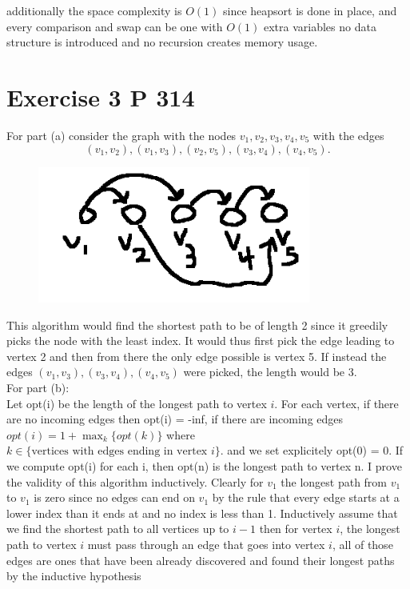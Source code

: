 \documentclass{amsart}
\begin{document}
additionally the space complexity is $O(1)$ since heapsort is done in place, and every comparison and swap can be one with $O(1)$ extra variables
no data structure is introduced and no recursion creates memory usage.


\section{Exercise 3 P 314}
For part (a)
consider the graph with the nodes
$v_1,v_2,v_3,v_4,v_5$
with the edges
\[
    (v_1,v_2), (v_1,v_3), (v_2,v_5), (v_3,v_4), (v_4,v_5)
.\] 
\begin{figure}[H]
    \centering
    \includegraphics[width=0.8\textwidth]{example_graph.png}
\end{figure}
This algorithm would find the shortest path to be of length 2 since it greedily picks the node
with the least index. It would thus first pick the edge leading to vertex 2 and then from there the only edge possible is vertex 5.
If instead the edges $(v_1,v_3),(v_3,v_4),(v_4,v_5)$ were picked, the length would be 3.
\\
For part (b):\\
Let opt(i) be the length of the longest path to vertex $i$. For each vertex, if there are no incoming
edges then opt(i) = -inf, if there are incoming edges $opt(i) = 1 + \max_{k}\{opt(k)\}$ where $k \in \{\text{vertices with edges ending in vertex $i$}\}$. and
we set explicitely opt(0) = 0. If we compute opt(i) for each i, then opt(n) is the longest path to vertex n.
I prove the validity of this algorithm inductively.
Clearly for $v_1$ the longest path from $v_1$ to $v_1$ is zero since no edges can end on $v_1$ by the rule that every edge starts at 
a lower index than it ends at and no index is less than 1.
Inductively assume that we find the shortest path to all vertices up to $i-1$ then for vertex $i$, the longest path to vertex $i$ must pass
through an edge that goes into vertex $i$, all of those edges are ones that have been already discovered and found their longest paths by the inductive hypothesis
\end{document}
